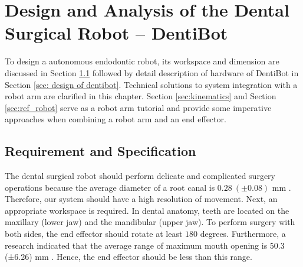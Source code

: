\chapter{Design and Analysis of the Dental Surgical Robot -- DentiBot}
\label{chapter3}
\hspace*{6mm}To design a autonomous endodontic robot, its workspace and dimension are discussed in Section \ref{sec:requirement} followed by detail description of hardware of DentiBot in Section \ref{sec: design of dentibot}. Technical solutions to system integration with a robot arm are clarified in this chapter. Section \ref{sec:kinematics} and Section \ref{sec:ref_robot} serve as a robot arm tutorial and provide some imperative approaches when combining a robot arm and an end effector.
\section{Requirement and Specification}
\label{sec:requirement}
\hspace*{6mm}The dental surgical robot should perform delicate and complicated surgery operations because the average diameter of a root canal is $0.28\ (\pm 0.08)$ mm \cite{wu2002does}. Therefore, our system should have a high resolution of movement. Next, an appropriate workspace is required. In dental anatomy, teeth are located on the maxillary (lower jaw) and the mandibular (upper jaw). To perform surgery with both sides, the end effector should rotate at least $180$ degrees. Furthermore, a research indicated that the average range of maximum mouth opening is 50.3 (±6.26) mm \cite{agrawal2015evaluation}. Hence, the end effector should be less than this range.
